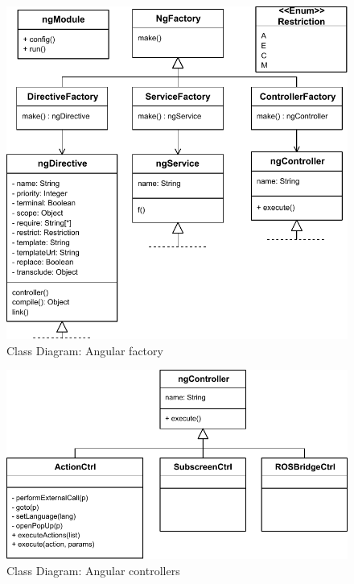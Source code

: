 \begin{figure}[htb]
    \centering
    \includegraphics{figures/design-class-ngfactory.pdf}
    \caption{Class Diagram: Angular factory}
    \label{fig:class-ngfactory}
\end{figure}

\begin{figure}[htb]
    \centering
    \includegraphics{figures/design-class-controllers.pdf}
    \caption{Class Diagram: Angular controllers}
    \label{fig:class-controllers}
\end{figure}

